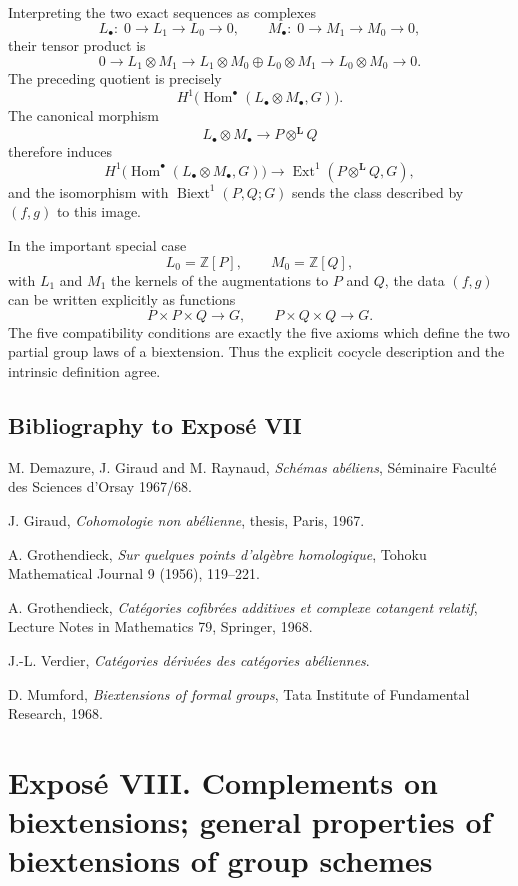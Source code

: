 \documentclass[11pt]{article}
\theoremstyle{plain}
\theoremstyle{definition}
\theoremstyle{remark}
\newcommand{\bZ}{\mathbb Z}
\DeclareMathOperator{\Hom}{Hom}
\DeclareMathOperator{\Ext}{Ext}
\DeclareMathOperator{\Biext}{Biext}
\newcommand{\bL}{\mathbf L}
\begin{document}
Interpreting the two exact sequences as complexes
\[
L_\bullet:\;0\to L_1\to L_0\to 0,\qquad
M_\bullet:\;0\to M_1\to M_0\to 0,
\]
their tensor product is
\[
0\to L_1\otimes M_1\to
L_1\otimes M_0\oplus L_0\otimes M_1
\to L_0\otimes M_0\to 0.
\]
The preceding quotient is precisely
\[
H^1\bigl(\Hom^\bullet(L_\bullet\otimes M_\bullet,G)\bigr).
\]
The canonical morphism
\[
L_\bullet\otimes M_\bullet\longrightarrow P\otimes^{\bL}Q
\]
therefore induces
\[
H^1\bigl(\Hom^\bullet(L_\bullet\otimes M_\bullet,G)\bigr)
\longrightarrow
\Ext^1(P\otimes^{\bL}Q,G),
\]
and the isomorphism with \(\Biext^1(P,Q;G)\) sends the class described by
\((f,g)\) to this image.

In the important special case
\[
L_0=\bZ[P],\qquad M_0=\bZ[Q],
\]
with \(L_1\) and \(M_1\) the kernels of the augmentations to \(P\) and \(Q\),
the data \((f,g)\) can be written explicitly as functions
\[
P\times P\times Q\to G,\qquad P\times Q\times Q\to G.
\]
The five compatibility conditions are exactly the five axioms which define the
two partial group laws of a biextension. Thus the explicit cocycle description
and the intrinsic definition agree.

\subsection*{Bibliography to Exposé VII}

\begin{enumerate}[label={[\arabic*]}]
\item M. Demazure, J. Giraud and M. Raynaud, \emph{Schémas abéliens}, Séminaire
Faculté des Sciences d'Orsay 1967/68.
\item J. Giraud, \emph{Cohomologie non abélienne}, thesis, Paris, 1967.
\item A. Grothendieck, \emph{Sur quelques points d'algèbre homologique}, Tohoku
Mathematical Journal 9 (1956), 119--221.
\item A. Grothendieck, \emph{Catégories cofibrées additives et complexe
cotangent relatif}, Lecture Notes in Mathematics 79, Springer, 1968.
\item J.-L. Verdier, \emph{Catégories dérivées des catégories abéliennes}.
\item D. Mumford, \emph{Biextensions of formal groups}, Tata Institute of
Fundamental Research, 1968.
\end{enumerate}

\clearpage
\section*{Exposé VIII. Complements on biextensions; general properties of biextensions of group schemes}
\end{document}
